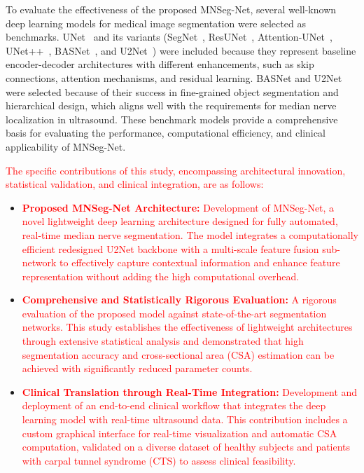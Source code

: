To evaluate the effectiveness of the proposed MNSeg-Net, several well-known deep learning models for medical image segmentation were selected as benchmarks. UNet~\cite{ronneberger2015u} and its variants (SegNet~\cite{badrinarayanan2017segnet}, ResUNet~\cite{diakogiannis2020resunet}, Attention-UNet~\cite{oktay2018attention}, UNet++~\cite{zhou2018unet++}, BASNet~\cite{qin2019basnet}, and U2Net~\cite{qin2020u2}) were included because they represent baseline encoder-decoder architectures with different enhancements, such as skip connections, attention mechanisms, and residual learning. BASNet and U2Net were selected because of their success in fine-grained object segmentation and hierarchical design, which aligns well with the requirements for median nerve localization in ultrasound. These benchmark models provide a comprehensive basis for evaluating the performance, computational efficiency, and clinical applicability of MNSeg-Net.


\textcolor{red}{The specific contributions of this study, encompassing architectural innovation, statistical validation, and clinical integration, are as follows:}

\begin{itemize}

\item \textcolor{red}{\textbf{Proposed MNSeg-Net Architecture:} Development of MNSeg-Net, a novel lightweight deep learning architecture designed for fully automated, real-time median nerve segmentation. The model integrates a computationally efficient redesigned U2Net backbone with a multi-scale feature fusion sub-network to effectively capture contextual information and enhance feature representation without adding the high computational overhead.}


\item \textcolor{red}{\textbf{Comprehensive and Statistically Rigorous Evaluation:} A rigorous evaluation of the proposed model against state-of-the-art segmentation networks. This study establishes the effectiveness of lightweight architectures through extensive statistical analysis and demonstrated that high segmentation accuracy and cross-sectional area (CSA) estimation can be achieved with significantly reduced parameter counts.}

\item \textcolor{red}{\textbf{Clinical Translation through Real-Time Integration:} Development and deployment of an end-to-end clinical workflow that integrates the deep learning model with real-time ultrasound data. This contribution includes a custom graphical interface for real-time visualization and automatic CSA computation, validated on a diverse dataset of healthy subjects and patients with carpal tunnel syndrome (CTS) to assess clinical feasibility.}



\end{itemize}







